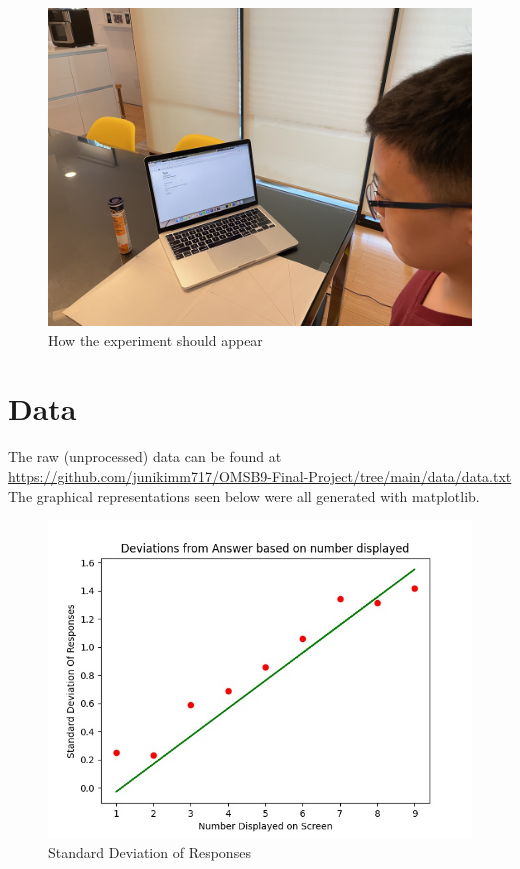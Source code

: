 \documentclass[12pt]{article}
\begin{document}
\begin{figure}
\centering
\includegraphics[scale=0.3]{diagram.JPG}
\caption{How the experiment should appear}
\end{figure}

\section{Data}
The raw (unprocessed) data can be found at \\
\url{https://github.com/junikimm717/OMSB9-Final-Project/tree/main/data/data.txt}
The graphical representations seen below were all generated with matplotlib.

\begin{figure} [p]
\centering
\includegraphics[scale=0.4]{regression.jpg}
\caption{Standard Deviation of Responses}
\end{figure}
\end{document}
